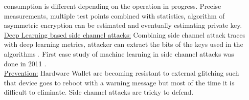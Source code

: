 \documentclass[conference]{IEEEtran}
\begin{document}
consumption is different depending on the operation in progress. Precise measurements, multiple test points combined with statistics, algorithm of 
asymmetric encryption can be estimated and eventually estimating private key\cite{san2019side}. \\  
\underline{Deep Learning based side channel attacks:} Combining side channel attack traces with deep learning metrics, attacker can extract the 
bits of the keys used in the algorithms \cite{timon2019non}. First case study of machine learning in side channel attacks was done in 
2011 \cite{hospodar2011machine}. \\
\underline{Prevention:} Hardware Wallet are becoming resistant to external glitching such that device goes to reboot with a warning message but 
most of the time it is difficult to eliminate. Side channel attacks are tricky to defend.

\end{document}
